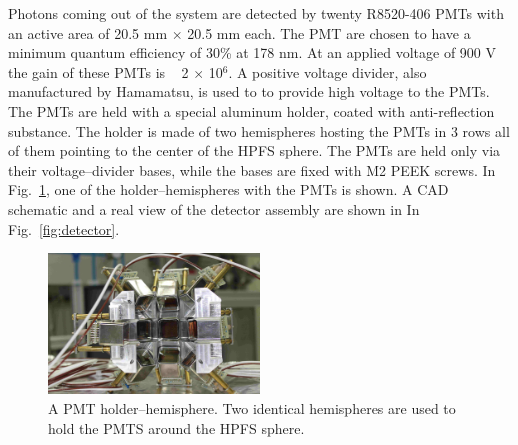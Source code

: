 Photons coming out of the system are detected by twenty R8520-406 PMTs with an 
active area of 20.5 mm $\times$ 20.5 mm each. 
The PMT are chosen to have a minimum 
quantum efficiency of 30\% at 178 nm. At an applied voltage of 900 
V the gain of these PMTs is ~ 2 $\times$ 10$^6$. A positive voltage divider, 
also manufactured by Hamamatsu,  is used to to provide high voltage to the PMTs. 
The PMTs are held with a special aluminum holder, coated with anti-reflection substance. 
The holder is made of two hemispheres hosting the PMTs in 3 rows all of them pointing to the 
center of the HPFS sphere. The PMTs are held only via their voltage--divider bases, while 
the bases are fixed with M2 PEEK screws. 
In Fig.~\ref{fig:pmtholder}, one of the holder--hemispheres with the 
PMTs is shown. A CAD schematic and a real view of the detector assembly are shown 
in In Fig.~\ref{fig:detector}.

\begin{figure}[h]
   \centering
   \includegraphics[width=0.5\textwidth]{PMTholder.JPG}
   \caption{A PMT holder--hemisphere. Two identical hemispheres are used to hold 
   the PMTS around the HPFS sphere.} 
   \label{fig:pmtholder}
\end{figure}


